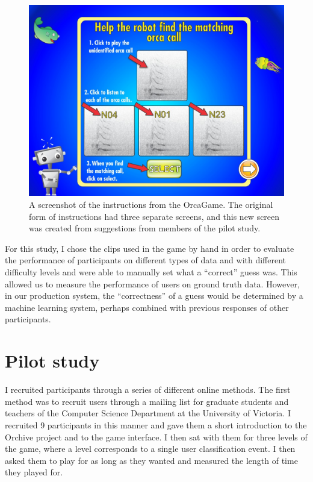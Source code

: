 \documentclass[12pt,oneside]{book}
\begin{document}
\begin{figure}[h]
\centering
\includegraphics[width=\columnwidth]{figures/orcagameInstructions}
\caption{A screenshot of the instructions from the OrcaGame.  The
  original form of instructions had three separate screens, and this
  new screen was created from suggestions from members of the pilot
  study. }
\label{fig:OrcaGameInstructions}
\end{figure}

For this study, I chose the clips used in the game by hand in order
to evaluate the performance of participants on different types of data
and with different difficulty levels and were able to manually set
what a ``correct'' guess was.  This allowed us to measure the
performance of users on ground truth data.  However, in our production
system, the ``correctness'' of a guess would be determined by a
machine learning system, perhaps combined with previous responses of
other participants.

\section{Pilot study}

I recruited participants through a series of different online
methods.  The first method was to recruit users through a mailing list
for graduate students and teachers of the Computer Science Department
at the University of Victoria.  I recruited 9 participants in this
manner and gave them a short introduction to the Orchive project and
to the game interface.  I then sat with them for three levels of the
game, where a level corresponds to a single user classification event.
I then asked them to play for as long as they wanted and measured
the length of time they played for.
\end{document}
